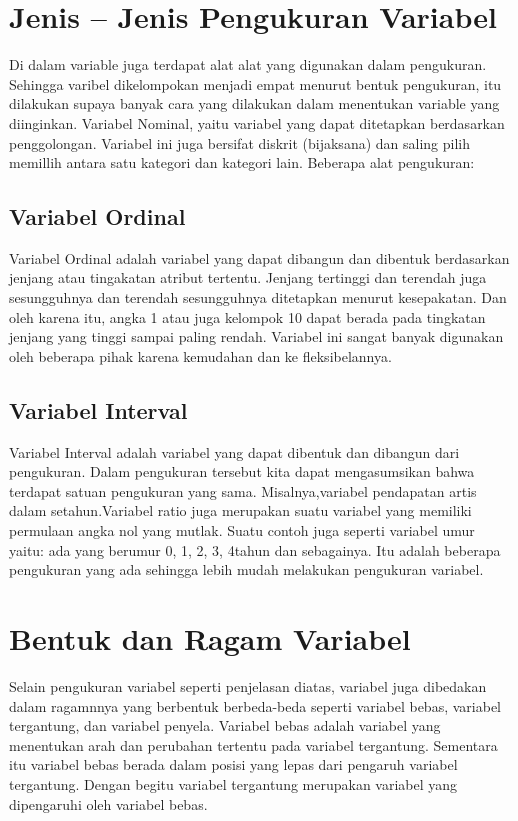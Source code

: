 \section{Jenis – Jenis Pengukuran Variabel}
Di dalam variable juga terdapat alat alat yang digunakan dalam pengukuran. Sehingga varibel dikelompokan menjadi empat menurut bentuk   
pengukuran, itu dilakukan supaya banyak cara yang dilakukan dalam menentukan variable yang diinginkan. Variabel Nominal, yaitu variabel
yang dapat ditetapkan berdasarkan penggolongan. Variabel ini juga bersifat diskrit (bijaksana) dan saling pilih memillih antara satu 
kategori dan kategori lain. Beberapa alat pengukuran:

\subsection{Variabel Ordinal}
Variabel Ordinal adalah variabel yang dapat dibangun dan dibentuk berdasarkan jenjang atau tingakatan atribut tertentu. Jenjang 
tertinggi dan terendah juga sesungguhnya dan terendah sesungguhnya ditetapkan menurut kesepakatan. Dan oleh karena itu, angka 1 atau 
juga kelompok 10 dapat berada pada tingkatan jenjang yang tinggi sampai paling rendah. Variabel ini sangat banyak digunakan oleh 
beberapa pihak karena kemudahan dan ke fleksibelannya.

\subsection{Variabel Interval}
Variabel Interval adalah variabel yang dapat dibentuk dan dibangun dari pengukuran. Dalam pengukuran tersebut kita dapat mengasumsikan 
bahwa terdapat satuan pengukuran yang sama. Misalnya,variabel pendapatan artis dalam setahun.Variabel ratio juga merupakan suatu 
variabel yang memiliki permulaan angka nol yang mutlak. Suatu contoh juga seperti variabel umur yaitu: ada yang berumur 0, 1, 2, 3, 
4tahun dan sebagainya. Itu adalah beberapa pengukuran yang ada sehingga lebih mudah melakukan pengukuran variabel.

\section{Bentuk dan Ragam Variabel}
Selain pengukuran variabel seperti penjelasan diatas, variabel juga dibedakan dalam ragamnnya yang berbentuk berbeda-beda seperti 
variabel bebas, variabel tergantung, dan variabel penyela. Variabel bebas adalah variabel yang menentukan arah dan perubahan tertentu 
pada variabel tergantung. Sementara itu variabel bebas berada dalam posisi yang lepas dari pengaruh variabel tergantung. Dengan begitu 
variabel tergantung merupakan variabel yang dipengaruhi oleh variabel bebas.


